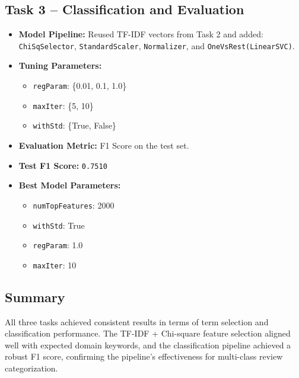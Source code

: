\documentclass[12pt]{article}
\begin{document}
\subsection{Task 3 – Classification and Evaluation}
\begin{itemize}
  \item \textbf{Model Pipeline:} Reused TF-IDF vectors from Task 2 and added:
    \texttt{ChiSqSelector}, \texttt{StandardScaler}, \texttt{Normalizer}, and \texttt{OneVsRest(LinearSVC)}.
  \item \textbf{Tuning Parameters:}
    \begin{itemize}
      \item \texttt{regParam}: \{0.01, 0.1, 1.0\}
      \item \texttt{maxIter}: \{5, 10\}
      \item \texttt{withStd}: \{True, False\}
    \end{itemize}
  \item \textbf{Evaluation Metric:} F1 Score on the test set.
  \item \textbf{Test F1 Score:} \texttt{0.7510}
  
  \item \textbf{Best Model Parameters:}
    \begin{itemize}
      \item \texttt{numTopFeatures}: 2000
      \item \texttt{withStd}: True
      \item \texttt{regParam}: 1.0
      \item \texttt{maxIter}: 10
    \end{itemize}
\end{itemize}

\subsection{Summary}
All three tasks achieved consistent results in terms of term selection and classification performance. The TF-IDF + Chi-square feature selection aligned well with expected domain keywords, and the classification pipeline achieved a robust F1 score, confirming the pipeline’s effectiveness for multi-class review categorization.
\end{document}
